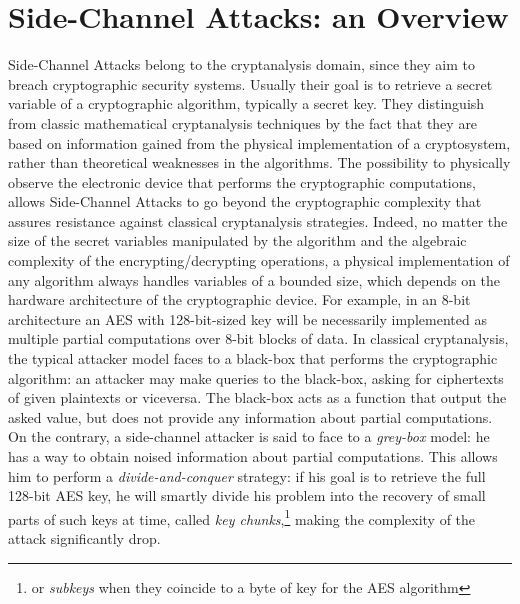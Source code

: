 \section{Side-Channel Attacks: an Overview}
Side-Channel Attacks belong to the cryptanalysis domain, since they aim to breach cryptographic security systems. Usually their goal is to retrieve a secret variable of a cryptographic algorithm, typically a secret key. They distinguish from classic mathematical cryptanalysis techniques by the fact that they are based on information gained from the physical implementation of a cryptosystem, rather than theoretical weaknesses in the algorithms. 
The possibility to physically observe the electronic device that performs the cryptographic computations, allows Side-Channel Attacks to go beyond the cryptographic complexity that assures resistance against classical cryptanalysis strategies.  Indeed, no matter the size of the secret variables manipulated by the algorithm and the algebraic complexity of the encrypting/decrypting operations, a physical implementation of any algorithm always handles variables of a bounded size, which depends on the hardware architecture of the cryptographic device. For example, in an 8-bit architecture an AES with 128-bit-sized key will be necessarily implemented as multiple partial computations over 8-bit blocks of data. In classical cryptanalysis, the typical attacker model faces to a black-box that performs the cryptographic algorithm: an attacker may make queries to the black-box, asking for ciphertexts of given plaintexts or viceversa. The black-box acts as a function that output the asked value, but does not provide any information about partial computations. On the contrary, a side-channel attacker is said to face to a \emph{grey-box} model: he has a way to obtain noised information about partial computations. This allows him to perform a \emph{divide-and-conquer} strategy: if his goal is to retrieve the full 128-bit AES key, he will smartly divide his problem into the recovery of small parts of such keys at time, called \emph{key chunks},\footnote{or \emph{subkeys} when they coincide to a byte of key for the AES algorithm} making the complexity of the attack significantly drop. \\

